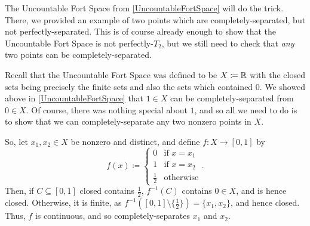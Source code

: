 \begin{exm}\label{exm4.5.48}
The Uncountable Fort Space from \cref{UncountableFortSpace} will do the trick.  There, we provided an example of two points which are completely-separated, but not perfectly-separated.  This is of course already enough to show that the Uncountable Fort Space is not perfectly-$T_2$, but we still need to check that \emph{any} two points can be completely-separated.

Recall that the Uncountable Fort Space was defined to be $X\coloneqq \mathbb{R}$ with the closed sets being precisely the finite sets and also the sets which contained $0$.  We showed above in \cref{UncountableFortSpace} that $1\in X$ can be completely-separated from $0\in X$.  Of course, there was nothing special about $1$, and so all we need to do is to show that we can completely-separate any two nonzero points in $X$.

So, let $x_1,x_2\in X$ be nonzero and distinct, and define $f:X\rightarrow [0,1]$ by
\begin{equation}
f(x)\coloneqq \begin{cases}0 & \text{if }x=x_1 \\ 1 & \text{if }x=x_2 \\ \tfrac{1}{2} & \text{otherwise}\end{cases}.
\end{equation}
Then, if $C\subseteq [0,1]$ closed contains $\frac{1}{2}$, $f^{-1}(C)$ contains $0\in X$, and is hence closed.  Otherwise, it is finite, as $f^{-1}\left( [0,1]\setminus \{ \frac{1}{2}\} \right) =\{ x_1,x_2\}$, and hence closed.  Thus, $f$ is continuous, and so completely-separates $x_1$ and $x_2$.
\end{exm}

